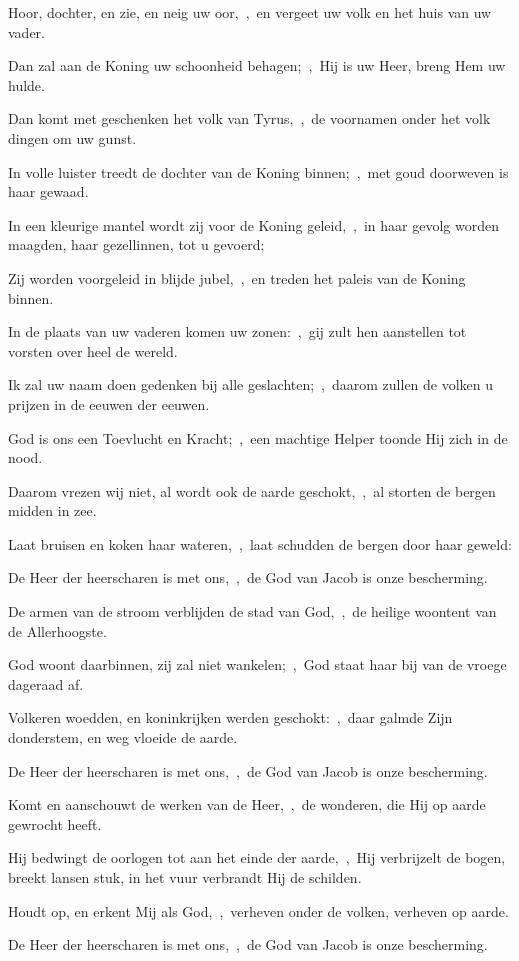 \documentclass[12pt,twoside,a5paper]{article}
\begin{document}
\begin{halfparskip}
  Hoor, dochter, en zie, en neig uw oor,~\sep\ en vergeet uw volk en het huis van uw vader.

  Dan zal aan de Koning uw schoonheid behagen;~\sep\ Hij is uw Heer, breng Hem uw hulde.

  Dan komt met geschenken het volk van Tyrus,~\sep\ de voornamen onder het volk dingen om uw gunst.

  In volle luister treedt de dochter van de Koning binnen;~\sep\ met goud doorweven is haar gewaad.

  In een kleurige mantel wordt zij voor de Koning geleid,~\sep\ in haar gevolg worden maagden, haar
  gezellinnen, tot u gevoerd;

  Zij worden voorgeleid in blijde jubel,~\sep\ en treden het paleis van de Koning binnen.

  In de plaats van uw vaderen komen uw zonen:~\sep\ gij zult hen aanstellen tot vorsten over heel de wereld.

  Ik zal uw naam doen gedenken bij alle geslachten;~\sep\ daarom zullen de volken u prijzen in de eeuwen der eeuwen.

   God is ons een Toevlucht en Kracht;~\sep\ een machtige Helper toonde Hij zich in de nood.

  Daarom vrezen wij niet, al wordt ook de aarde geschokt,~\sep\ al storten de bergen midden in zee.

  Laat bruisen en koken haar wateren,~\sep\ laat schudden de bergen door haar geweld:

  De Heer der heerscharen is met ons,~\sep\ de God van Jacob is onze bescherming.

  De armen van de stroom verblijden de stad van God,~\sep\ de heilige woontent van de Allerhoogste.

  God woont daarbinnen, zij zal niet wankelen;~\sep\ God staat haar bij van de vroege dageraad af.

  Volkeren woedden, en koninkrijken werden geschokt:~\sep\ daar galmde Zijn donderstem, en weg vloeide de aarde.

  De Heer der heerscharen is met ons,~\sep\ de God van Jacob is onze bescherming.

  Komt en aanschouwt de werken van de Heer,~\sep\ de wonderen, die Hij op aarde gewrocht heeft.

  Hij bedwingt de oorlogen tot aan het einde der aarde,~\sep\ Hij verbrijzelt de bogen, breekt lansen stuk, in het vuur verbrandt Hij de schilden.

  Houdt op, en erkent Mij als God,~\sep\ verheven onder de volken, verheven op aarde.

  De Heer der heerscharen is met ons,~\sep\ de God van Jacob is onze bescherming.
\end{halfparskip}

\end{document}
